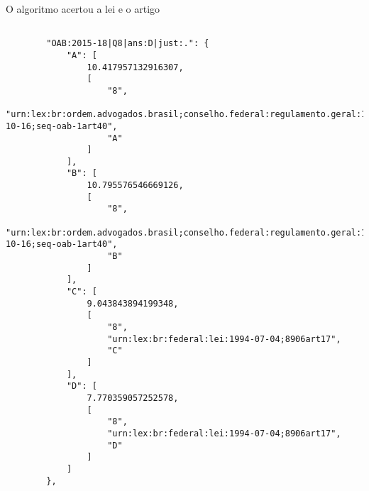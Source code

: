 \documentclass[12pt]{article}
\begin{document}
O algoritmo acertou a lei e o artigo

\begin{lstlisting}

        "OAB:2015-18|Q8|ans:D|just:.": {
            "A": [
                10.417957132916307,
                [
                    "8",
                    "urn:lex:br:ordem.advogados.brasil;conselho.federal:regulamento.geral:1994-10-16;seq-oab-1art40",
                    "A"
                ]
            ],
            "B": [
                10.795576546669126,
                [
                    "8",
                    "urn:lex:br:ordem.advogados.brasil;conselho.federal:regulamento.geral:1994-10-16;seq-oab-1art40",
                    "B"
                ]
            ],
            "C": [
                9.043843894199348,
                [
                    "8",
                    "urn:lex:br:federal:lei:1994-07-04;8906art17",
                    "C"
                ]
            ],
            "D": [
                7.770359057252578,
                [
                    "8",
                    "urn:lex:br:federal:lei:1994-07-04;8906art17",
                    "D"
                ]
            ]
        },
        
\end{lstlisting}




\end{document}
